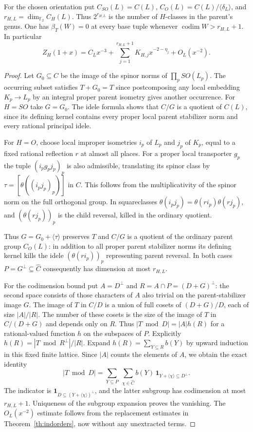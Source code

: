\begin{theorem}\label{th:indorders-terminate}
For the chosen orientation put $C_{SO}(L)=C(L)$, $C_O(L)=C(L)/\langle\delta_L\rangle$, and $r_{H,L}=\dim_{\mathbb F_2} C_H(L)$. Thus $2^{r_{H,L}}$ is the number of $H$-classes in the parent's genus. One has $\beta_T(W)=0$ at every base tuple whenever $\operatorname{codim}W>r_{H,L}+1$. In particular
\[
 Z_H(1+x)=C_Lx^{-3}+\sum_{j=1}^{r_{H,L}+1}K_{H,j}x^{-2-\eta_j}
              +O_L(x^{-2}).
\]
\end{theorem}
\begin{proof}
Let $G_0\subseteq C$ be the image of the spinor norms of $\prod_p SO(L_p)$. The occurring subset satisfies $T+G_0=T$ since postcomposing any local embedding $K_p\to L_p$ by an integral proper parent isometry gives another occurrence. For $H=SO$ take $G=G_0$. The idele formula shows that $C/G$ is a quotient of $C(L)$, since its defining kernel contains every proper local parent stabilizer norm and every rational principal idele.

For $H=O$, choose local improper isometries $i_p$ of $L_p$ and $j_p$ of $K_p$, equal to a fixed rational reflection $r$ at almost all places. For a proper local transporter $g_p$ the tuple $(i_p g_p j_p)_p$ is also admissible, translating its spinor class by $\tau=[\theta((i_p j_p)_p)]$ in $C$. This follows from the multiplicativity of the spinor norm on the full orthogonal group. In squareclasses $\theta(i_pj_p)=\theta(ri_p)\theta(rj_p)$, and $(\theta(rj_p))_p$ is the child reversal, killed in the ordinary quotient. 

Thus $G=G_0+\langle\tau\rangle$ preserves $T$ and $C/G$ is a quotient of the ordinary parent group $C_O(L)$: in addition to all proper parent stabilizer norms its defining kernel kills the idele $(\theta(ri_p))_p$ representing parent reversal. In both cases $P=G^\perp\subseteq\widehat C$ consequently has dimension at most $r_{H,L}$.

For the codimension bound put $A=D^\perp$ and
$R=A\cap P=(D+G)^\perp$: the second space consists of those
characters of $A$ also trivial on the parent-stabilizer image $G$. The image of $T$ in $C/D$ is a union of full cosets of $(D+G)/D$, each of size $|A|/|R|$. The number of these cosets is the size of the image of $T$ in $C/(D+G)$ and depends only on $R$. Thus $|T\bmod D|=|A|h(R)$ for a rational-valued function $h$ on the subspaces of $P$. Explicitly $h(R)=|T\bmod R^\perp|/|R|$. Expand $h(R)=\sum_{Y\subseteq R} b(Y)$ by upward induction in this fixed finite lattice. Since $|A|$ counts the elements of $A$, we obtain the exact identity
\[
 |T\bmod D|=
 \sum_{Y\subseteq P}\ \sum_{\chi\in\widehat C}
 b(Y)\,\mathbf1_{Y+\langle\chi\rangle\subseteq D^\perp}.
\]
The indicator is $\mathbf1_{D\subseteq (Y+\langle\chi\rangle)^\perp}$, and the latter subgroup has codimension at most $r_{H,L}+1$. Uniqueness of the subgroup expansion proves the vanishing. The $O_L(x^{-2})$ estimate follows from the replacement estimates in Theorem~\ref{th:indorders}, now without any unextracted terms.
\end{proof}

